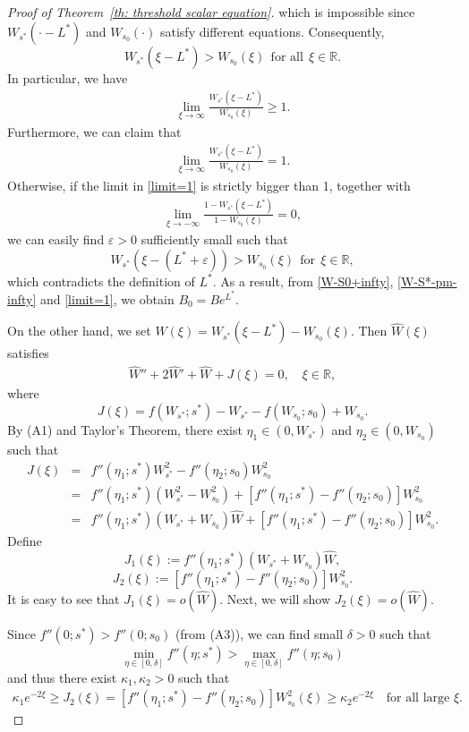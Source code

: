 \documentclass[11pt,a4paper]{article}
\numberwithin{equation}{section}
\numberwithin{figure}{section}
\newcommand{\red}[1]{{\color{red}#1}}
\newcommand\bea{\begin{eqnarray}}
\newcommand\eea{\end{eqnarray}}
\newcommand\beaa{\begin{eqnarray*}}
\newcommand\eeaa{\end{eqnarray*}}
\begin{document}
\begin{proof}[Proof of Theorem~\ref{th: threshold scalar equation}]
which is impossible since $W_{s^*}(\cdot-L^*)$ and $W_{s_0}(\cdot)$ satisfy different equations. Consequently,
$$W_{s^*}(\xi-L^*)> W_{s_0}(\xi)\ \ \text{for all}\ \ \xi\in\mathbb{R}.$$
In particular, we have
\beaa
\lim_{\xi\to\infty}\frac{W_{s^*}(\xi-L^*)}{W_{s_0}(\xi)}\geq1.
\eeaa
Furthermore, we can claim that
\bea\label{limit=1}
\lim_{\xi\to\infty}\frac{W_{s^*}(\xi-L^*)}{W_{s_0}(\xi)}=1.
\eea
Otherwise, if the limit in \eqref{limit=1} is strictly bigger than 1, together with
\bea\label{(1-W)-decay}
\lim_{\xi\to-\infty}\frac{1-W_{s^*}(\xi-L^*)}{1-W_{s_0}(\xi)}=0,
\eea
we can easily  find $\varepsilon>0$ sufficiently small such that
$$W_{s^*}(\xi-(L^*+\varepsilon))> W_{s_0}(\xi)\ \ \text{for}\ \ \xi\in\mathbb{R},$$
which contradicts the definition of $L^*$.
As a result, from \eqref{W-S0+infty}, \eqref{W-S*-pm-infty} and \eqref{limit=1}, we obtain $B_0=Be^{L^*}$.


On the other hand, we set $\widehat{W}(\xi)=W_{s^*}(\xi-L^*)-W_{s_0}(\xi)$. Then $\widehat{W}(\xi)$ satisfies
\bea\label{W-hat-eq2}
\widehat{W}''+2\widehat{W}'+\widehat{W}+J(\xi)=0, \quad \xi\in\mathbb{R},
\eea
where
$$J(\xi)=f(W_{s^*};s^*)- W_{s^*}-f(W_{s_0};s_0)+ W_{s_0}.$$
By (A1) and Taylor's Theorem, there exist $\eta_1\in(0, W_{s^*})$ and $\eta_2\in(0,W_{s_0})$ such that
\beaa
J(\xi)&=&f''(\eta_1;s^*)W^2_{s^*}-f''(\eta_2;s_0)W^2_{s_0}\\
      &=&f''(\eta_1;s^*)(W^2_{s^*}-W^2_{s_0})+[f''(\eta_1;s^*)-f''(\eta_2;s_0)]W^2_{s_0}\\
      &=&f''(\eta_1;s^*)(W_{s^*}+W_{s_0})\widehat{W}+[f''(\eta_1;s^*)-f''(\eta_2;s_0)]W^2_{s_0}.
\eeaa
Define 
$$J_1(\xi):=f''(\eta_1;s^*)(W_{s^*}+W_{s_0})\widehat{W},$$ 
$$J_2(\xi):=[f''(\eta_1;s^*)-f''(\eta_2;s_0)]W^2_{s_0}.$$
 It is easy to see that $J_1(\xi)=o(\widehat{W})$. Next, we will show $J_2(\xi)=o(\widehat{W})$.

Since $f''(0;s^*)>f''(0;s_0)$ (from (A3)), we can find small $\delta>0$ such that
$$\min_{\eta\in[0,\delta]}f''(\eta;s^*)>\max_{\eta\in[0,\delta]}f''(\eta;s_0)$$
and thus
there exist $\kappa_1,\kappa_2>0$ such that
\bea\label{J-lower bound}
\kappa_1e^{-2\xi}\ge J_2(\xi)=[f''(\eta_1;s^*)-f''(\eta_2;s_0)]W^2_{s_0}(\xi)\ge \kappa_2 e^{-2\xi}\quad \mbox{for all large $\xi$}.
\eea


\end{proof}
\end{document}
